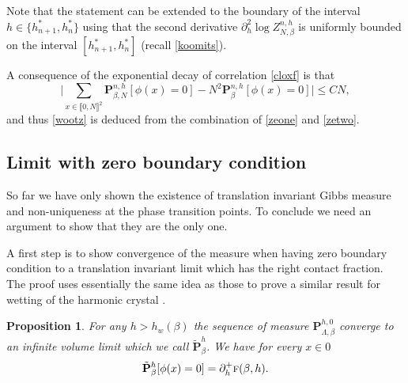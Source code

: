 \documentclass[10pt]{amsart}
\numberwithin{equation}{section}
\theoremstyle{plain}
\newtheorem{proposition}[theorem]{Proposition}
\theoremstyle{definition}
\newcommand{\lint}{\llbracket}
\newcommand{\rint}{\rrbracket}
\newcommand{\bP}{{\ensuremath{\mathbf P}} }
\newcommand{\gb}{\beta}
\newcommand{\gL}{\Lambda}
\newcommand{\tf}{\textsc{f}}
\begin{document}
Note that the statement can be extended to the boundary of the interval $h\in\{h^*_{n+1},h^*_n\}$ using that
the second derivative $\partial^2_h \log Z^{n,h}_{N,\gb}$ is uniformly bounded on the interval $[h^*_{n+1},h^*_n]$ (recall \eqref{koomits}).

A consequence of the exponential decay of correlation \eqref{cloxf} is that
\begin{equation}\label{zetwo}
\biggl|\sum_{x\in \lint 0,N \rint^2 }\bP^{n,h}_{\gb,N}[\phi(x)=0]- N^2\bP^{n,h}_{\gb}[\phi(x)=0]\biggr|\le C N,
\end{equation}
and thus \eqref{wootz} is deduced from the combination of \eqref{zeone} and \eqref{zetwo}.

\subsection{Limit with zero boundary condition}\label{zerob}

So far we have only shown the existence of translation invariant Gibbs measure and non-uniqueness at the phase transition points.
To conclude we need an argument to show that they are the only one.

A first step is to show convergence of the measure when having zero boundary condition to a translation invariant limit which has the right contact fraction.
The proof uses essentially the same idea as those to prove a similar result for wetting of the harmonic crystal
\cite[\S 5]{cf:GL}.

\begin{proposition}
For any $h>h_w(\gb)$
the sequence of measure $\bP^{h,0}_{\gL,\gb}$ converge to an infinite volume limit which we call $\tilde \bP^{h}_{\gb}$.
We have for every $x\in 0$
\begin{equation}\label{zioup}
\tilde \bP^{h}_{\gb}[\phi(x)=0]=\partial^+_h \tf(\gb,h).
\end{equation}
\end{proposition}
\end{document}
